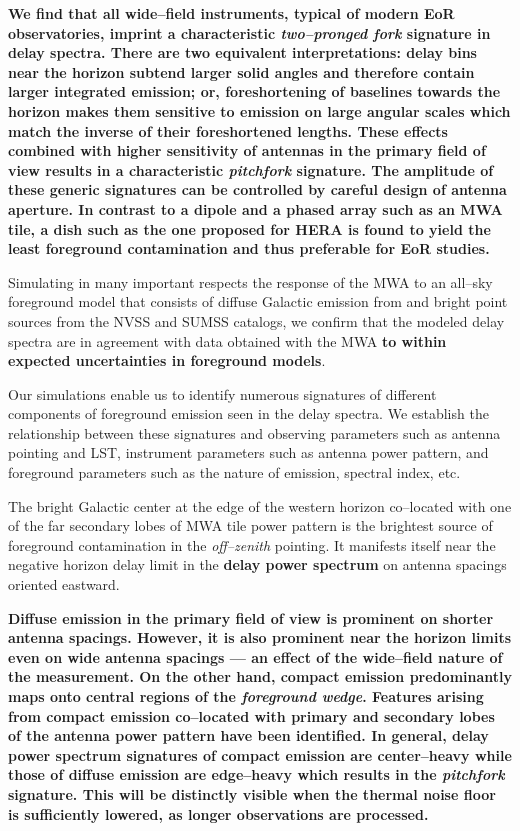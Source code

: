 \documentclass[preprint2,iop,numberedappendix]{emulateapj}
\begin{document}
{\bf We find that all wide--field instruments, typical of modern EoR observatories, imprint a characteristic {\it two--pronged fork} signature in delay spectra. There are two equivalent interpretations: delay bins near the horizon subtend larger solid angles and therefore contain larger integrated emission; or, foreshortening of baselines towards the horizon makes them sensitive to emission on large angular scales which match the inverse of their foreshortened lengths. These effects combined with higher sensitivity of antennas in the primary field of view results in a characteristic {\it pitchfork} signature. The amplitude of these generic signatures can be controlled by careful design of antenna aperture. In contrast to a dipole and a phased array such as an MWA tile, a dish such as the one proposed for HERA is found to yield the least foreground contamination and thus preferable for EoR studies.}

Simulating in many important respects the response of the MWA to an all--sky foreground model that consists of diffuse Galactic emission from \citet{deo08} and bright point sources from the NVSS and SUMSS catalogs, we confirm that the modeled delay spectra are in agreement with data obtained with the MWA {\bf to within expected uncertainties in foreground models}. 

Our simulations enable us to identify numerous signatures of different components of foreground emission seen in the delay spectra. We establish the relationship between these signatures and observing parameters such as antenna pointing and LST, instrument parameters such as antenna power pattern, and foreground parameters such as the nature of emission, spectral index, etc. 

The bright Galactic center at the edge of the western horizon co--located with one of the far secondary lobes of MWA tile power pattern is the brightest source of foreground contamination in the {\it off--zenith} pointing. It manifests itself near the negative horizon delay limit in the {\bf delay power spectrum} on antenna spacings oriented eastward. 

{\bf Diffuse emission in the primary field of view is prominent on shorter antenna spacings. However, it is also prominent near the horizon limits even on wide antenna spacings --- an effect of the wide--field nature of the measurement. On the other hand, compact emission predominantly maps onto central regions of the {\it foreground wedge}. Features arising from compact emission co--located with primary and secondary lobes of the antenna power pattern have been identified. In general, {\bf delay power spectrum} signatures of compact emission are center--heavy while those of diffuse emission are edge--heavy which results in the {\it pitchfork} signature. This will be distinctly visible when the thermal noise floor is sufficiently lowered, as longer observations are processed.} 
\end{document}
